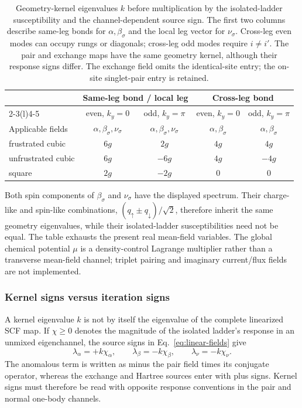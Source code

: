 \documentclass[11pt]{article}
\begin{document}
\begin{table}[htbp]
\centering
\small
\begin{tabular}{@{}lcccc@{}}
\toprule
& \multicolumn{2}{c}{Same-leg bond / local leg}
& \multicolumn{2}{c}{Cross-leg bond} \\
\cmidrule(lr){2-3}\cmidrule(l){4-5}
& even, \(k_y=0\) & odd, \(k_y=\pi\)
& even, \(k_y=0\) & odd, \(k_y=\pi\) \\
\midrule
Applicable fields
& \(\alpha,\beta_\sigma,\nu_\sigma\)
& \(\alpha,\beta_\sigma,\nu_\sigma\)
& \(\alpha,\beta_\sigma\)
& \(\alpha,\beta_\sigma\) \\
\midrule
frustrated cubic   & \(6g\) & \( 2g\) & \(4g\) & \( 4g\) \\
unfrustrated cubic & \(6g\) & \(-6g\) & \(4g\) & \(-4g\) \\
square              & \(2g\) & \(-2g\) & \(0\)  & \(0\) \\
\bottomrule
\end{tabular}
\caption{Geometry-kernel eigenvalues \(k\) before multiplication by the
isolated-ladder susceptibility and the channel-dependent source sign.  The
first two columns describe same-leg bonds for \(\alpha,\beta_\sigma\) and the
local leg vector for \(\nu_\sigma\).  Cross-leg even modes can occupy rungs or
diagonals; cross-leg odd modes require \(i\ne i'\).  The pair and exchange maps
have the same geometry kernel, although their response signs differ.  The
exchange field omits the identical-site entry; the on-site singlet-pair entry
is retained.}
\label{tab:kernel-spectrum}
\end{table}

Both spin components of \(\beta_\sigma\) and \(\nu_\sigma\) have the displayed
spectrum.  Their charge-like and spin-like combinations,
\((q_\uparrow\pm q_\downarrow)/\sqrt{2}\), therefore inherit the same geometry
eigenvalues, while their isolated-ladder susceptibilities need not be equal.
The table exhausts the present real mean-field variables.  The global chemical
potential \(\mu\) is a density-control Lagrange multiplier rather than a
transverse mean-field channel; triplet pairing and imaginary current/flux
fields are not implemented.

\subsubsection{Kernel signs versus iteration signs}

A kernel eigenvalue \(k\) is not by itself the eigenvalue of the complete
linearized SCF map.  If \(\chi\ge0\) denotes the magnitude of the isolated
ladder's response in an unmixed eigenchannel, the source signs in
Eq.~\eqref{eq:linear-fields} give
\begin{equation}
 \lambda_{\alpha}=+k\chi_{\alpha},
 \qquad
 \lambda_{\beta}=-k\chi_{\beta},
 \qquad
 \lambda_{\nu}=-k\chi_{\nu}.
\label{eq:response-signs}
\end{equation}
The anomalous term is written as minus the pair field times its conjugate
operator, whereas the exchange and Hartree sources enter with plus signs.
Kernel signs must therefore be read with opposite response conventions in the
pair and normal one-body channels.
\end{document}
